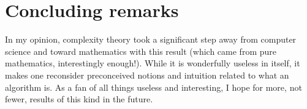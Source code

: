 \section{Concluding remarks}
In my opinion, complexity theory took a significant step away from computer science and toward mathematics with this result (which came from pure mathematics, interestingly enough!). While it is wonderfully useless in itself, it makes one reconsider preconceived notions and intuition related to what an algorithm is. As a fan of all things useless and interesting, I hope for more, not fewer, results of this kind in the future. 

